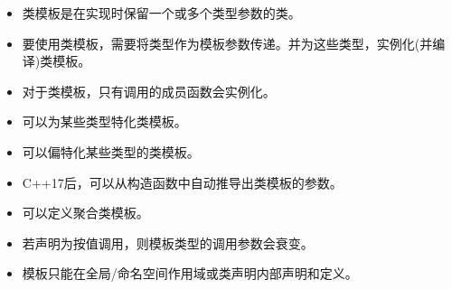 
\begin{itemize}
\item 
类模板是在实现时保留一个或多个类型参数的类。

\item 
要使用类模板，需要将类型作为模板参数传递。并为这些类型，实例化(并编译)类模板。

\item 
对于类模板，只有调用的成员函数会实例化。

\item 
可以为某些类型特化类模板。

\item 
可以偏特化某些类型的类模板。

\item 
C++17后，可以从构造函数中自动推导出类模板的参数。

\item 
可以定义聚合类模板。

\item 
若声明为按值调用，则模板类型的调用参数会衰变。

\item 
模板只能在全局/命名空间作用域或类声明内部声明和定义。
\end{itemize}